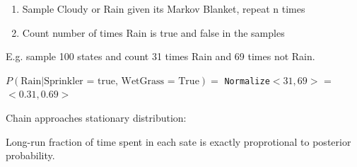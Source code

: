 \documentclass[
../../EiKI_Summary.tex,
]
{subfiles}
\begin{document}
\begin{enumerate}
    \item Sample Cloudy or Rain given its Markov Blanket, repeat n times
    \item Count number of times Rain is true and false in the samples 
\end{enumerate}

E.g. sample 100 states and count 31 times Rain and 69 times not Rain.

\begin{csmb*}
    $P(\text{Rain}|\text{Sprinkler = true, WetGrass = True}) =$ \texttt{Normalize$<31,69>$} = $<0.31, 0.69>$
\end{csmb*}

\begin{defbox}
    [Theorem]
    Chain approaches stationary distribution:

    Long-run fraction of time spent in each sate is exactly proprotional to posterior probability.
\end{defbox}
\end{document}
